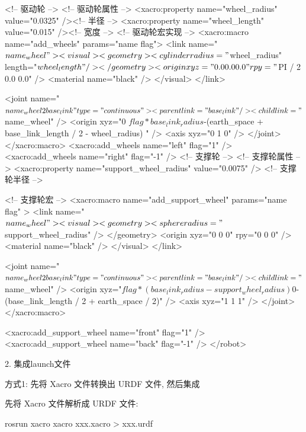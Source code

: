 \documentclass[openany, fontset=windowsold]{ctexbook}
\theoremstyle{kaiti}
\theoremstyle{normal}
\begin{document}
\begin{xml}
      <!-- 驱动轮 -->
      <!-- 驱动轮属性 -->
      <xacro:property name="wheel_radius" value="0.0325" /><!-- 半径 -->
      <xacro:property name="wheel_length" value="0.015" /><!-- 宽度 -->
      <!-- 驱动轮宏实现 -->
      <xacro:macro name="add_wheels" params="name flag">
        <link name="${name}_wheel">
          <visual>
            <geometry>
              <cylinder radius="${wheel_radius}" length="${wheel_length}" />
            </geometry>
            <origin xyz="0.0 0.0 0.0" rpy="${PI / 2} 0.0 0.0" />
            <material name="black" />
          </visual>
        </link>

        <joint name="${name}_wheel2base_link" type="continuous">
          <parent link="base_link" />
          <child link="${name}_wheel" />
          <origin xyz="0 ${flag * base_link_radius} ${-(earth_space + base_link_length / 2 - wheel_radius) }" />
          <axis xyz="0 1 0" />
        </joint>
      </xacro:macro>
      <xacro:add_wheels name="left" flag="1" />
      <xacro:add_wheels name="right" flag="-1" />
      <!-- 支撑轮 -->
      <!-- 支撑轮属性 -->
      <xacro:property name="support_wheel_radius" value="0.0075" /> <!-- 支撑轮半径 -->

      <!-- 支撑轮宏 -->
      <xacro:macro name="add_support_wheel" params="name flag" >
        <link name="${name}_wheel">
          <visual>
              <geometry>
                  <sphere radius="${support_wheel_radius}" />
              </geometry>
              <origin xyz="0 0 0" rpy="0 0 0" />
              <material name="black" />
          </visual>
        </link>

        <joint name="${name}_wheel2base_link" type="continuous">
            <parent link="base_link" />
            <child link="${name}_wheel" />
            <origin xyz="${flag * (base_link_radius - support_wheel_radius)} 0 ${-(base_link_length / 2 + earth_space / 2)}" />
            <axis xyz="1 1 1" />
        </joint>
      </xacro:macro>

      <xacro:add_support_wheel name="front" flag="1" />
      <xacro:add_support_wheel name="back" flag="-1" />
  </robot>
\end{xml}

2. 集成launch文件

方式1: 先将 Xacro 文件转换出 URDF 文件, 然后集成

先将 Xacro 文件解析成 URDF 文件:

\begin{bash}
  rosrun xacro xacro xxx.xacro > xxx.urdf
\end{bash}
\end{document}
